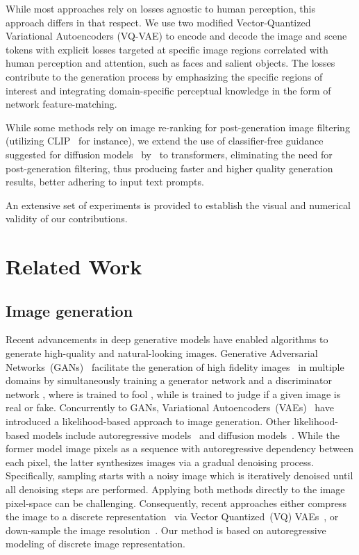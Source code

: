 \documentclass[final]{cvpr}
\begin{document}
While most approaches rely on losses agnostic to human perception, this approach differs in that respect. We use two modified Vector-Quantized Variational Autoencoders (VQ-VAE) to encode and decode the image and scene tokens with explicit losses targeted at specific image regions correlated with human perception and attention, such as faces and salient objects.
The losses contribute to the generation process by emphasizing the specific regions of interest and integrating domain-specific perceptual knowledge in the form of network feature-matching. 

While some methods rely on image re-ranking for post-generation image filtering (utilizing CLIP~\cite{radford2021learning} for instance), we extend the use of classifier-free guidance suggested for diffusion models~\cite{sohl2015deep,ho2020denoising} by~\cite{ho2021classifier,nichol2021glide} to transformers, eliminating the need for post-generation filtering, thus producing faster and higher quality generation results, better adhering to input text prompts.

An extensive set of experiments is provided to establish the visual and numerical validity of our contributions.

\section{Related Work}
\subsection{Image generation} Recent advancements in deep generative models have enabled algorithms to generate high-quality and natural-looking images. Generative Adversarial Networks~(GANs)~\cite{goodfellow2014generative} facilitate the generation of high fidelity images~\cite{karras2021alias,brock2018large,karras2020analyzing,tseng2021regularizing} in multiple domains by simultaneously training a generator network  and a discriminator network , where  is trained to fool , while  is trained to judge if a given image is real or fake. Concurrently to GANs, Variational Autoencoders~(VAEs)~\cite{kingma2013auto,vahdat2020nvae} have introduced a likelihood-based approach to image generation. Other likelihood-based models include autoregressive models~\cite{van2016conditional,parmar2018image,esser2021taming, pmlr-v119-chen20s} and diffusion models~\cite{dhariwal2021diffusion,ho2022cascaded,ho2020denoising}. While the former model image pixels as a sequence with autoregressive dependency between each pixel, the latter synthesizes images via a gradual denoising process. Specifically, sampling starts with a noisy image which is iteratively denoised until all denoising steps are performed. Applying both methods directly to the image pixel-space can be challenging. Consequently, recent approaches either compress the image to a discrete representation~\cite{esser2021taming,van2017neural} via Vector Quantized~(VQ) VAEs~\cite{van2017neural}, or down-sample the image resolution~\cite{dhariwal2021diffusion,ho2022cascaded}. Our method is based on autoregressive modeling of discrete image representation.
\end{document}
